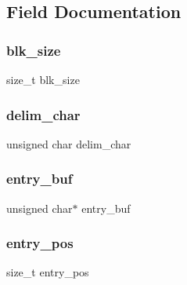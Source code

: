 \subsection{Field Documentation}
\hypertarget{structcsv__parser_a365db0540bd9887aec764442d23e5e85}{}\label{structcsv__parser_a365db0540bd9887aec764442d23e5e85} 
\subsubsection{\texorpdfstring{blk\+\_\+size}{blk\_size}}
{\footnotesize\ttfamily size\+\_\+t blk\+\_\+size}

\hypertarget{structcsv__parser_a42bfd1492c290309b8ceca0f42f1901f}{}\label{structcsv__parser_a42bfd1492c290309b8ceca0f42f1901f} 
\subsubsection{\texorpdfstring{delim\+\_\+char}{delim\_char}}
{\footnotesize\ttfamily unsigned char delim\+\_\+char}

\hypertarget{structcsv__parser_a188bc93ecf5d24ea761c9f152e6e84fb}{}\label{structcsv__parser_a188bc93ecf5d24ea761c9f152e6e84fb} 
\subsubsection{\texorpdfstring{entry\+\_\+buf}{entry\_buf}}
{\footnotesize\ttfamily unsigned char$\ast$ entry\+\_\+buf}

\hypertarget{structcsv__parser_a4dafa17fc8952592ad1d7339cec87b0c}{}\label{structcsv__parser_a4dafa17fc8952592ad1d7339cec87b0c} 
\subsubsection{\texorpdfstring{entry\+\_\+pos}{entry\_pos}}
{\footnotesize\ttfamily size\+\_\+t entry\+\_\+pos}

\hypertarget{structcsv__parser_a050339de09565a18f08b217913851295}{}\label{structcsv__parser_a050339de09565a18f08b217913851295} 
